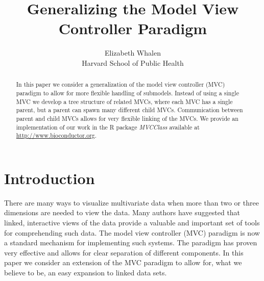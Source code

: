 \documentclass{article}[11pt]
\newcommand{\Rpackage}[1]{{\textit{#1}}}
\begin{document}


\author{Elizabeth Whalen\\Harvard School of Public Health}
\title{Generalizing the Model View Controller Paradigm}

\maketitle

\begin{abstract} 
  In this paper we consider a generalization of the model
  view controller (MVC) paradigm to allow for more flexible handling
  of submodels.  Instead of using a single MVC we develop a tree
  structure of related MVCs, where each MVC has a single parent, but a
  parent can spawn many different child MVCs.  Communication between
  parent and child MVCs allows for very flexible linking of the
  MVCs.  We provide an implementation of our work in the R package
  \Rpackage{MVCClass} available at \url{http://www.bioconductor.org}. 
\end{abstract}


\section{Introduction}\label{Sec:Intro}



There are many ways to visualize multivariate data when more than
two or three dimensions are needed to view the data.  Many authors
\citep{intGrUnwin, DynGraphics, IEEEVisual, GGobi, DataDesk}
have suggested that linked, interactive views of the data
provide a valuable and important set of tools for comprehending such
data.  The model view controller (MVC) paradigm is now a standard
mechanism for implementing such systems.  The paradigm has proven very
effective and allows for clear separation of different components.
In this paper we consider an extension of the MVC paradigm to allow
for, what we believe to be, an easy expansion to linked data sets.
\end{document}
